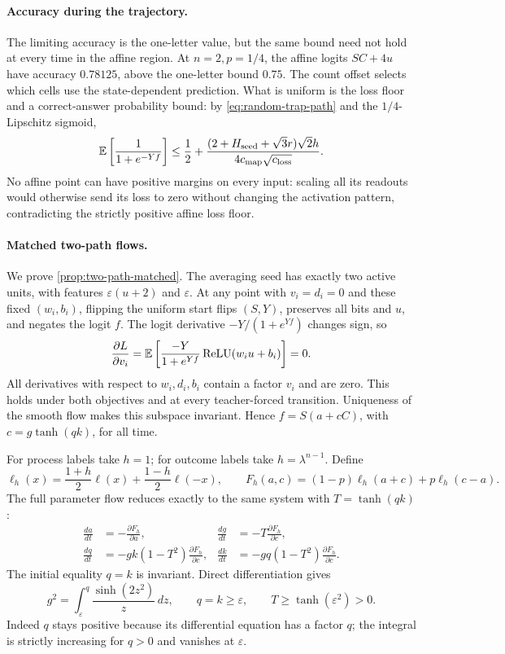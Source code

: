\paragraph{Accuracy during the trajectory.}
The limiting accuracy is the one-letter value, but the same bound need not hold
at every time in the affine region. At $n=2,p=1/4$, the affine logits $SC+4u$
have accuracy $0.78125$, above the one-letter bound $0.75$.
The count offset selects which cells use the state-dependent prediction.
What is uniform is the loss floor and a correct-answer probability bound:
by \cref{eq:random-trap-path} and the $1/4$-Lipschitz sigmoid,
\[
 \mathbb E\left[\frac1{1+e^{-Yf}}\right]
 \le\frac12+
 \frac{(2+H_{\mathrm{seed}}+\sqrt3r)\sqrt2h}
      {4c_{\mathrm{map}}\sqrt{c_{\mathrm{loss}}}}.
\]
No affine point can have positive margins on every input: scaling all its readouts
would otherwise send its loss to zero without changing the activation pattern,
contradicting the strictly positive affine loss floor.

\paragraph{Matched two-path flows.}
\label{app:two-path-matched}
We prove \cref{prop:two-path-matched}. The averaging seed has exactly two active
units, with features $\varepsilon(u+2)$ and $\varepsilon$.
At any point with $v_i=d_i=0$ and these fixed $(w_i,b_i)$, flipping the uniform
start flips $(S,Y)$, preserves all bits and $u$, and negates the logit $f$.
The logit derivative $-Y/(1+e^{Yf})$ changes sign, so
\[
 \frac{\partial L}{\partial v_i}
 =\mathbb E\left[\frac{-Y}{1+e^{Yf}}\operatorname{ReLU}(w_i u+b_i)\right]=0.
\]
All derivatives with respect to $w_i,d_i,b_i$ contain a factor $v_i$ and are zero.
This holds under both objectives and at every teacher-forced transition.
Uniqueness of the smooth flow makes this subspace invariant. Hence
$f=S(a+cC)$, with $c=g\tanh(qk)$, for all time.

For process labels take $h=1$; for outcome labels take $h=\lambda^{n-1}$.
Define
\[
 \ell_h(x)=\frac{1+h}{2}\ell(x)+\frac{1-h}{2}\ell(-x),\qquad
 F_h(a,c)=(1-p)\ell_h(a+c)+p\ell_h(c-a).
\]
The full parameter flow reduces exactly to the same system with $T=\tanh(qk)$:
\begin{equation}
\begin{aligned}
 \frac{da}{dt}&=-\frac{\partial F_h}{\partial a},&
 \frac{dg}{dt}&=-T\frac{\partial F_h}{\partial c},\\
 \frac{dq}{dt}&=-gk(1-T^2)\frac{\partial F_h}{\partial c},&
 \frac{dk}{dt}&=-gq(1-T^2)\frac{\partial F_h}{\partial c}.
\end{aligned}
\label{eq:two-path-common-flow}
\end{equation}
The initial equality $q=k$ is invariant. Direct differentiation gives
\begin{equation}
 g^2=\int_\varepsilon^q\frac{\sinh(2z^2)}{z}\,dz,
 \qquad q=k\ge\varepsilon,\qquad T\ge\tanh(\varepsilon^2)>0.
 \label{eq:two-path-factor-balance}
\end{equation}
Indeed $q$ stays positive because its differential equation has a factor $q$;
the integral is strictly increasing for $q>0$ and vanishes at $\varepsilon$.

